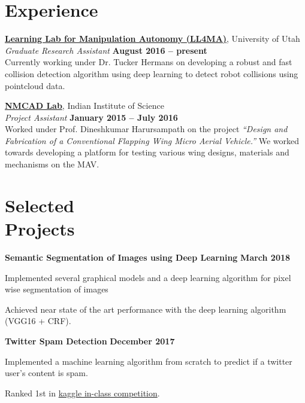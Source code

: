 \documentclass[letterpaper, margin, line]{resume}
\begin{document}
\begin{resume}
    \section{\mysidestyle Experience}

    \href{https://robot-learning.cs.utah.edu}{\textbf{Learning Lab for Manipulation Autonomy (LL4MA)}}, University of Utah \vspace{1pt}\\\vspace{1pt}%
    \textsl{Graduate Research Assistant} \hfill \textbf{August 2016 -- present}\\
	Currently working under Dr. Tucker Hermans on developing a robust and fast collision detection algorithm using deep learning to detect robot collisions using pointcloud data.

	

    \href{http://www.aero.iisc.ernet.in/~dinesh/web/}{\textbf{NMCAD Lab}}, Indian Institute of Science \vspace{1pt}\\\vspace{1pt}%
    \textsl{Project Assistant} \hfill \textbf{January 2015 -- July 2016}\\
    Worked under Prof. Dineshkumar Harursampath on the project \textit{``Design and Fabrication of a Conventional Flapping Wing Micro Aerial Vehicle.''} We worked towards developing a platform for testing various wing designs, materials and mechanisms on the MAV.

    
	\section{\mysidestyle Selected\\Projects}
	\textbf{Semantic Segmentation of Images using Deep Learning} \hfill \textbf{March 2018}
	\begin{list2}
		\item Implemented several graphical models and a deep learning algorithm for pixel wise segmentation of images
		\item Achieved near state of the art performance with the deep learning algorithm (VGG16 + CRF).
	\end{list2}\vspace{-1.5mm}
	
	\textbf{Twitter Spam Detection} \hfill \textbf{December 2017}
	\begin{list2}
		\item Implemented a machine learning algorithm from scratch to predict if a twitter user's content is spam.
		\item Ranked 1st in \href{https://www.kaggle.com/c/uofu-ml-fall-2017}{kaggle in-class competition}.
	\end{list2}\vspace{-1.5mm}


\end{resume}
\end{document}
